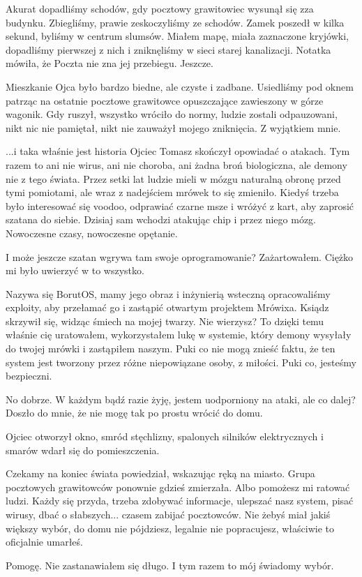 Akurat dopadliśmy schodów, gdy pocztowy grawitowiec wysunął się zza budynku. 
Zbiegliśmy, prawie zeskoczyliśmy ze schodów. Zamek poszedł w kilka sekund, byliśmy w centrum slumsów.
Miałem mapę, miała zaznaczone kryjówki, dopadliśmy pierwszej z nich i zniknęliśmy w sieci starej kanalizacji.
Notatka mówiła, że Poczta nie zna jej przebiegu. Jeszcze.

\divider{}
Mieszkanie Ojca było bardzo biedne, ale czyste i zadbane.
Usiedliśmy pod oknem patrząc na ostatnie pocztowe grawitowce opuszczające zawieszony w górze wagonik.
Gdy ruszył, wszystko wróciło do normy, ludzie zostali odpauzowani, nikt nic nie pamiętał, nikt nie zauważył mojego zniknięcia.
Z wyjątkiem mnie.

\ds{} ...i taka właśnie jest historia \dm{} Ojciec Tomasz skończył opowiadać o atakach. \dm{}
Tym razem to ani nie wirus, ani nie choroba, ani żadna broń biologiczna, ale demony nie z tego świata.
Przez setki lat ludzie mieli w mózgu naturalną obronę przed tymi pomiotami, ale wraz z nadejściem mrówek to się zmieniło.
Kiedyś trzeba było interesować się voodoo, odprawiać czarne msze i wróżyć z kart, aby zaprosić szatana do siebie.
Dzisiaj sam wchodzi atakując chip i przez niego mózg. Nowoczesne czasy, nowoczesne opętanie.\de{}

\ds{} I może jeszcze szatan wgrywa tam swoje oprogramowanie? \dm{} Zażartowałem. Ciężko mi było uwierzyć w to wszystko. \de{}

\ds{} Nazywa się BorutOS, mamy jego obraz i inżynierią wsteczną opracowaliśmy exploity, aby przełamać go i zastąpić otwartym projektem Mrówixa. \dm{}
Ksiądz skrzywił się, widząc śmiech na mojej twarzy. \dm{} Nie wierzysz? To dzięki temu właśnie cię uratowałem, wykorzystałem lukę w systemie, który
demony wysyłały do twojej mrówki i zastąpiłem naszym. Puki co nie mogą znieść faktu, że ten system jest tworzony przez różne niepowiązane osoby, z miłości.
Puki co, jesteśmy bezpieczni. \de{}

\ds{} No dobrze. W każdym bądź razie żyję, jestem uodporniony na ataki, ale co dalej? \dm{} Doszło do mnie, że nie mogę tak po prostu wrócić do domu.\de{}

Ojciec otworzył okno, smród stęchlizny, spalonych silników elektrycznych i smarów wdarł się do pomieszczenia.

\ds{} Czekamy na koniec świata \dm{} powiedział, wskazując ręką na miasto. Grupa pocztowych grawitowców ponownie gdzieś zmierzała. \dm{}
Albo pomożesz mi ratować ludzi. Każdy się przyda, trzeba zdobywać informacje, ulepszać nasz system, pisać wirusy, dbać o słabszych... czasem zabijać pocztowców. 
Nie żebyś miał jakiś większy wybór, do domu nie pójdziesz, legalnie nie popracujesz, właściwie to oficjalnie umarłeś. \de{}

\ds{} Pomogę. \dm{} Nie zastanawiałem się długo. \dm{} I tym razem to mój świadomy wybór. \de{}












